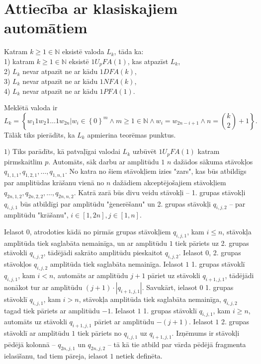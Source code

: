 \documentclass{ludis}
\begin{document}
\section{Attiecība ar klasiskajiem automātiem}
\begin{teorema}
Katram $k \geq 1 \in \mathbb{N}$ eksistē valoda $L_k$, tāda ka:\\ 
1) katram $k \geq 1 \in \mathbb{N}$ eksistē $1U_pFA(1)$, kas atpazīst $L_k$,\\ %
2) $L_k$ nevar atpazīt ne ar kādu $1DFA(k)$,\\
3) $L_k$ nevar atpazīt ne ar kādu $1NFA(k)$,\\
4) $L_k$ nevar atpazīt ne ar kādu $1PFA(1)$.
\end{teorema}
\begin{pieradijums} Meklētā valoda ir
\[
L_k = \left\{ w_1 1 w_2 1 \ldots 1 w_{2n} |
		w_i \in \left\{ 0 \right\}^m \wedge
		m \geq 1 \in \mathbb{N} \wedge
		w_i = w_{2n-i+1} \wedge
		n={k\choose 2}+1 \right\}.
\]
Tālāk tiks pierādīts, ka $L_k$ apmierina teorēmas punktus.

$1)$ Tiks parādīts, kā patvaļīgai valodai $L_k$ uzbūvēt $1U_pFA(1)$ katram pirmskaitlim $p$. Automāts, sāk darbu ar amplitūdu $1$ $n$ dažādos sākuma stāvokļos $q_{1,1,1},q_{1,2,1},\ldots,q_{1,n,1}$. No katra no šiem stāvokļiem izies "zars", kas būs atbildīgs par amplitūdas krāšanu vienā no $n$ dažādiem akceptējošajiem stāvokļiem $q_{2n,1,2},q_{2n,2,2},\ldots,q_{2n,n,2}$. Katrā zarā būs divu veidu stāvokļi -- 1. grupas stāvokļi $q_{i,j,1}$ būs atbildīgi par amplitūdu "ģenerēšanu" un 2. grupas stāvokļi $q_{i,j,2}$ -- par amplitūdu "krāšanu", $i \in \left[1, 2n \right], j \in \left[1, n \right]$.

Ielasot $0$, atrodoties kādā no pirmās grupas stāvokļiem $q_{i,j,1}$, kam $i \leq n$, stāvokļa amplitūda tiek saglabāta nemainīga, un ar amplitūdu $1$ tiek pāriets uz 2. grupas stāvokli $q_{i,j,2}$, tādējādi sakrāto amplitūdu pieskaitot $q_{i,j,2}$. Ielasot $0$, 2. grupas stāvokļos $q_{i,j,2}$ amplitūda tiek saglabāta nemainīga. Ielasot $1$ 1. grupas stāvoklī $q_{i,j,1}$, kam $i < n$, automāts ar amplitūdu $j + 1$ pāriet uz stāvokli $q_{i + 1,j,1}$, tādējādi nonākot tur ar amplitūdu $(j + 1) \cdot \left| q_{i + 1,j,1} \right|$. %
Savukārt, ielasot $0$ 1. grupas stāvoklī $q_{i,j,1}$, kam $i > n$, stāvokļa amplitūda tiek saglabāta nemainīga, $q_{i,j,2}$ tagad tiek pāriets ar amplitūdu $-1$. Ielasot $1$ 1. grupas stāvoklī $q_{i,j,1}$, kam $i \geq n$, automāts uz stāvokli $q_{i + 1,j,1}$ pāriet ar amplitūdu $-(j + 1)$. Ielasot $1$ 2. grupas stāvoklī ar amplitūdu $1$ tiek pāriets no $q_{i,j,1}$ uz $q_{i + 1,j,1}$. Izņēmums ir stāvokļi pēdējā kolonnā -- $q_{2n,j,1}$ un $q_{2n,j,2}$ -- tā kā tie atbild par vārda pēdējā fragmenta ielasīšanu, tad tiem pāreja, ielasot $1$ netiek definēta.


\end{pieradijums}
\end{document}
